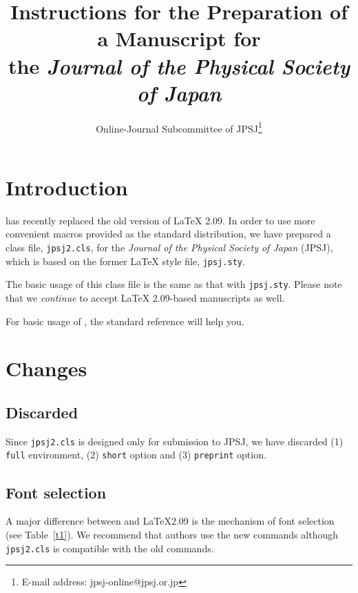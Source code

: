 \documentclass{jpsj2}
\title{%
Instructions for the Preparation of a Manuscript for \\
the \textit{Journal of the Physical Society of Japan}
}
\author{%
Online-Journal Subcommittee of JPSJ\thanks{E-mail address: jpsj-online@jpsj.or.jp}
}
\begin{document}
\maketitle

\section{Introduction}

\LaTeXe{} has recently replaced the old version of \LaTeX{} 2.09.  In order to use more convenient macros provided as the standard \LaTeXe{} distribution, we have prepared a \LaTeXe{} class file, \texttt{jpsj2.cls}, for the \textit{Journal of the Physical Society of Japan} (JPSJ), which is based on the former \LaTeX{} style file, \texttt{jpsj.sty}.

The basic usage of this class file is the same as that with \texttt{jpsj.sty}.  Please note that we \emph{continue} to accept \LaTeX{} 2.09-based manuscripts as well.

For basic usage of \LaTeXe{}, the standard reference will help you.~\cite{blue}

\section{Changes}

\subsection{Discarded}

Since \texttt{jpsj2.cls} is designed only for submission to JPSJ, we have discarded (1) \texttt{full} environment, (2) \texttt{short} option and (3) \texttt{preprint} option.

\subsection{Font selection}

A major difference between \LaTeXe{} and \LaTeX 2.09 is the mechanism of font selection (see Table~\ref{t1}).  We recommend that authors use the new commands although \texttt{jpsj2.cls} is compatible with the old commands. 
\end{document}
